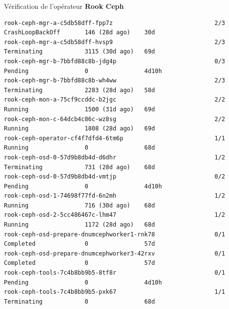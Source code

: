 \begin{frame}[shrink=5,fragile]{Vérification de l'opérateur \textbf{Rook Ceph}}
\begin{tiny}
\begin{Verbatim}[commandchars=\\\{\}]
rook-ceph-mgr-a-c5db58dff-fpp7z                             2/3     CrashLoopBackOff       146 (28d ago)    30d
rook-ceph-mgr-a-c5db58dff-hvsp9                             2/3     Terminating            3115 (30d ago)   69d
rook-ceph-mgr-b-7bbfd88c8b-jdg4p                            0/3     Pending                0                4d10h
rook-ceph-mgr-b-7bbfd88c8b-wh4ww                            2/3     Terminating            2283 (28d ago)   58d
rook-ceph-mon-a-75cf9ccddc-b2jgc                            2/2     Running                1500 (31d ago)   69d
rook-ceph-mon-c-64dcb4c86c-wz8sg                            2/2     Running                1808 (28d ago)   69d
rook-ceph-operator-cf4f7dfd4-6tm6p                          1/1     Running                0                68d
rook-ceph-osd-0-57d9b8db4d-d6dhr                            1/2     Terminating            731 (28d ago)    68d
rook-ceph-osd-0-57d9b8db4d-vmtjp                            0/2     Pending                0                4d10h
rook-ceph-osd-1-74698f77fd-6n2mh                            1/2     Running                716 (30d ago)    68d
rook-ceph-osd-2-5cc486467c-lhm47                            1/2     Running                1172 (28d ago)   68d
rook-ceph-osd-prepare-dnumcephworker1-rnk78                 0/1     Completed              0                57d
rook-ceph-osd-prepare-dnumcephworker3-42rxv                 0/1     Completed              0                57d
rook-ceph-tools-7c4b8bb9b5-8tf8r                            0/1     Pending                0                4d10h
rook-ceph-tools-7c4b8bb9b5-pxk67                            1/1     Terminating            0                68d
\end{Verbatim}
\end{tiny}

\end{frame}


